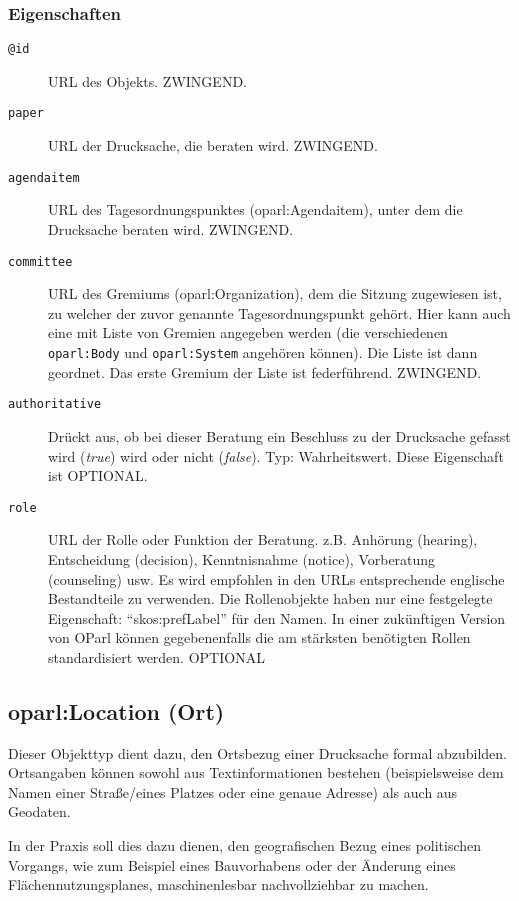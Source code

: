 \documentclass[,a4paper]{article}
\begin{document}
\subsubsection{Eigenschaften}\label{eigenschaften-7}

\begin{description}
\item[\texttt{@id}]
URL des Objekts. ZWINGEND.
\item[\texttt{paper}]
URL der Drucksache, die beraten wird. ZWINGEND.
\item[\texttt{agendaitem}]
URL des Tagesordnungspunktes (oparl:Agendaitem), unter dem die
Drucksache beraten wird. ZWINGEND.
\item[\texttt{committee}]
URL des Gremiums (oparl:Organization), dem die Sitzung zugewiesen ist,
zu welcher der zuvor genannte Tagesordnungspunkt gehört. Hier kann auch
eine mit Liste von Gremien angegeben werden (die verschiedenen
\texttt{oparl:Body} und \texttt{oparl:System} angehören können). Die
Liste ist dann geordnet. Das erste Gremium der Liste ist federführend.
ZWINGEND.
\item[\texttt{authoritative}]
Drückt aus, ob bei dieser Beratung ein Beschluss zu der Drucksache
gefasst wird (\emph{true}) wird oder nicht (\emph{false}). Typ:
Wahrheitswert. Diese Eigenschaft ist OPTIONAL.
\item[\texttt{role}]
URL der Rolle oder Funktion der Beratung. z.B. Anhörung (hearing),
Entscheidung (decision), Kenntnisnahme (notice), Vorberatung
(counseling) usw. Es wird empfohlen in den URLs entsprechende englische
Bestandteile zu verwenden. Die Rollenobjekte haben nur eine festgelegte
Eigenschaft: ``skos:prefLabel'' für den Namen. In einer zukünftigen
Version von OParl können gegebenenfalls die am stärksten benötigten
Rollen standardisiert werden. OPTIONAL
\end{description}

\subsection{oparl:Location (Ort)}\label{oparlux5flocation}

Dieser Objekttyp dient dazu, den Ortsbezug einer Drucksache formal
abzubilden. Ortsangaben können sowohl aus Textinformationen bestehen
(beispielsweise dem Namen einer Straße/eines Platzes oder eine genaue
Adresse) als auch aus Geodaten.

In der Praxis soll dies dazu dienen, den geografischen Bezug eines
politischen Vorgangs, wie zum Beispiel eines Bauvorhabens oder der
Änderung eines Flächennutzungsplanes, maschinenlesbar nachvollziehbar zu
machen.
\end{document}
